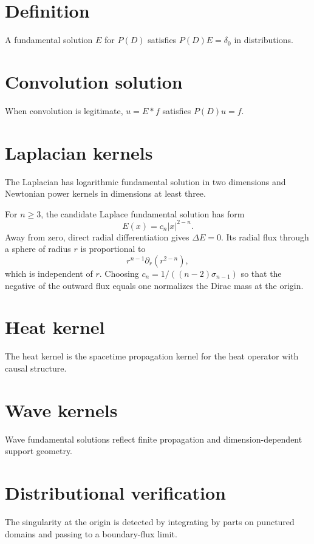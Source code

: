 \section{Definition}
A fundamental solution $E$ for $P(D)$ satisfies $P(D)E=\delta_0$ in distributions.

\section{Convolution solution}
When convolution is legitimate, $u=E*f$ satisfies $P(D)u=f$.

\section{Laplacian kernels}
The Laplacian has logarithmic fundamental solution in two dimensions and Newtonian power kernels in dimensions at least three.


\begin{example}\label{ex:iii24-expand-01}
For \(n\ge3\), the candidate Laplace fundamental solution has form
\[
E(x)=c_n|x|^{2-n}.
\]
Away from zero, direct radial differentiation gives \(\Delta E=0\). Its radial
flux through a sphere of radius \(r\) is proportional to
\[
r^{n-1}\partial_r(r^{2-n}),
\]
which is independent of \(r\). Choosing \(c_n=1/((n-2)\sigma_{n-1})\) so that the negative of the outward flux equals one
normalizes the Dirac mass at the origin.
\end{example}
\section{Heat kernel}
The heat kernel is the spacetime propagation kernel for the heat operator with causal structure.

\section{Wave kernels}
Wave fundamental solutions reflect finite propagation and dimension-dependent support geometry.

\section{Distributional verification}
The singularity at the origin is detected by integrating by parts on punctured domains and passing to a boundary-flux limit.


